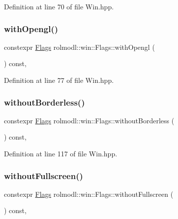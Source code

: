 Definition at line 70 of file Win.\+hpp.

\mbox{\label{structrolmodl_1_1win_1_1_flags_aa8fa7a9010a4cf3d1bf67a2199371312}} 
\subsubsection{\texorpdfstring{withOpengl()}{withOpengl()}}
{\footnotesize\ttfamily constexpr \mbox{\hyperlink{structrolmodl_1_1win_1_1_flags}{Flags}} rolmodl\+::win\+::\+Flags\+::with\+Opengl (\begin{DoxyParamCaption}{ }\end{DoxyParamCaption}) const\hspace{0.3cm}{\ttfamily [inline]}, {\ttfamily [noexcept]}}



Definition at line 77 of file Win.\+hpp.

\mbox{\label{structrolmodl_1_1win_1_1_flags_a2440e1681f7ab485a59c7838cf0f4468}} 
\subsubsection{\texorpdfstring{withoutBorderless()}{withoutBorderless()}}
{\footnotesize\ttfamily constexpr \mbox{\hyperlink{structrolmodl_1_1win_1_1_flags}{Flags}} rolmodl\+::win\+::\+Flags\+::without\+Borderless (\begin{DoxyParamCaption}{ }\end{DoxyParamCaption}) const\hspace{0.3cm}{\ttfamily [inline]}, {\ttfamily [noexcept]}}



Definition at line 117 of file Win.\+hpp.

\mbox{\label{structrolmodl_1_1win_1_1_flags_a4fae094b5826ef684f8928004787be7c}} 
\subsubsection{\texorpdfstring{withoutFullscreen()}{withoutFullscreen()}}
{\footnotesize\ttfamily constexpr \mbox{\hyperlink{structrolmodl_1_1win_1_1_flags}{Flags}} rolmodl\+::win\+::\+Flags\+::without\+Fullscreen (\begin{DoxyParamCaption}{ }\end{DoxyParamCaption}) const\hspace{0.3cm}{\ttfamily [inline]}, {\ttfamily [noexcept]}}



